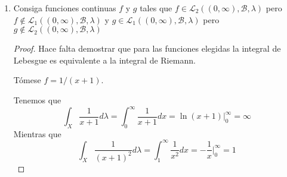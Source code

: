 \documentclass[letter,twoside,12pt]{article}
\numberwithin{equation}{section}
\begin{document}
\begin{enumerate}[label = (\textbf{\arabic*.})]
\begin{proof}
Por otra parte tenemos que para todo $x \in \mathbb{R}_{\geq0} $

$$ 0 \leq \frac{d}{dx} \ln(1+x) = \frac{1}{1+x} \leq 1 = \frac{d}{dx} x. $$

Esto quiere decir, por una parte que ambas funciones son crecientes para $x > 0$ y por otra que la función $x$ crece más rápido que la función $\ln(1+x)$. Por lo tanto concluimos \eqref{eq:ln}.

Podemos usar \eqref{eq:ln} para el caso $x = f/n $ para concluir que

$$ \ln(1+f/n) \leq f/n. $$

A partir de esta expresión se deduce fácilmente que 

$$ n\ln(1+(f/n)^\alpha) \leq \alpha n\ln(1+f/n)  \leq \alpha f. $$

Por lo tanto, concluimos que la secuencia es dominada por $ \alpha f $ y por lo tanto podemos utilizar el teorema de convergencia dominada \cite[Teorema 12.24]{hewwit} para concluir que 

\begin{equation}
\lim_{n \to \infty} \int_X n \ln(1+(f/n)^\alpha) = \int_X \lim_{n \to \infty}  n\ln(1+(f/n)^\alpha))
\end{equation}

de donde concluimos por \eqref{eq:lim} que si $ \alpha = 1 $ entonces la expresión es igual a $ \int_X f d\mu = c $ y si $ \alpha \geq 1 $ entonces la expresión es igual a $ \int_X 0 d\mu = 0 $ 
\end{proof}
\item  Consiga funciones continuas $ f $ y $ g $ tales que $ f \in \mathcal{L}_2((0, \infty), \mathcal{B}, \lambda) $ pero $ f \not \in \mathcal{L}_1((0, \infty), \mathcal{B}, \lambda) $ y
$ g \in \mathcal{L}_1((0, \infty), \mathcal{B}, \lambda)$ pero  $g \not \in \mathcal{L}_2((0, \infty), \mathcal{B}, \lambda) $
\begin{proof}

Hace falta demostrar que para las funciones elegidas la integral de Lebesgue es equivalente a la integral de Riemann.

Tómese $ f = 1/(x+1) $.

Tenemos que 
\begin{equation}
\int_X \frac{1}{x+1}d\lambda = \int_{0}^\infty \frac{1}{x+1}dx =  \ln(x+1)\Big|_0^\infty = \infty
\end{equation}
Mientras que
\begin{equation}
\int_X \frac{1}{(x+1)^2}d\lambda = \int_{1}^\infty \frac{1}{x^2}dx = -\frac{1}{x}\Big|_0^\infty = 1
\end{equation}


\end{proof}
\end{enumerate}
\end{document}
